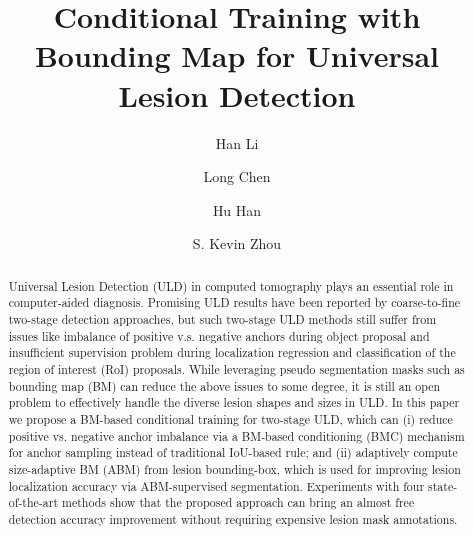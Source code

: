 \documentclass[runningheads]{llncs}
\begin{document}
\title{Conditional Training with Bounding Map for Universal Lesion Detection}



\author{Han Li \and Long Chen \and Hu Han\Envelope \and S. Kevin Zhou\Envelope}

\newcommand*\samethanks[1][\value{footnote}]{\footnotemark[#1]}




\maketitle              \begin{abstract}
{Universal Lesion Detection (ULD) in computed tomography plays an essential role in computer-aided diagnosis.  Promising ULD results have been reported by coarse-to-fine two-stage detection approaches, but such two-stage ULD methods still suffer from issues like imbalance of positive v.s. negative anchors during object proposal and insufficient supervision problem during localization regression and classification of the region of interest (RoI) proposals. While leveraging pseudo segmentation masks such as bounding map (BM) can reduce the above issues to some degree, it is still an open problem to effectively handle the diverse lesion shapes and sizes in ULD.
In this paper we propose a BM-based conditional training for two-stage ULD, which can (i) reduce positive vs. negative anchor imbalance via a BM-based conditioning (BMC) mechanism for anchor sampling instead of traditional IoU-based rule; and (ii) adaptively compute size-adaptive BM (ABM) from lesion bounding-box, which is used for improving lesion localization accuracy via ABM-supervised segmentation. Experiments with four state-of-the-art methods show that the proposed approach can bring an almost free detection accuracy improvement without requiring expensive lesion mask annotations.}

\end{abstract}
\end{document}
